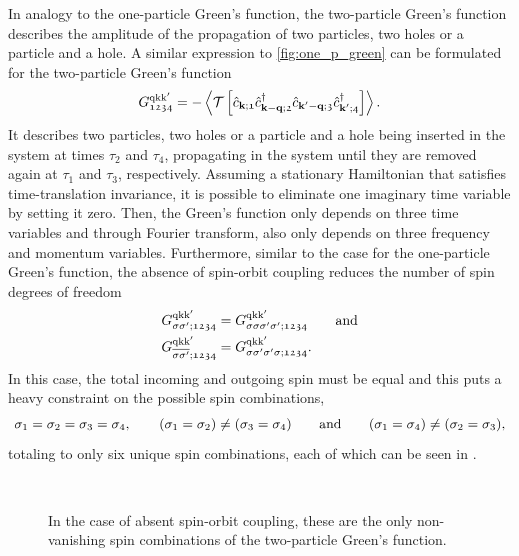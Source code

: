 \documentclass[../../main.tex]{subfiles}
\begin{document}
In analogy to the one-particle Green's function, the two-particle Green's function describes the amplitude of the propagation of two particles, two holes or a particle and a hole. A similar expression to \eqref{fig:one_p_green} can be formulated for the two-particle Green's function
\begin{align}
	G_{\mathfrak{1234}}^{\text{q}\text{k}\text{k}'}=-\left\langle \mathcal{T}\left [\hat{c}_{\textbf{k};\mathfrak{1}}\hat{c}^{\dagger}_{\textbf{k}-\textbf{q};\mathfrak{2}}\hat{c}_{\textbf{k}'-\textbf{q};\mathfrak{3}}\hat{c}^{\dagger}_{\textbf{k}';\mathfrak{4}}\right ]\right\rangle.
\end{align}
It describes two particles, two holes or a particle and a hole being inserted in the system at times $\tau_2$ and $\tau_4$, propagating in the system until they are removed again at $\tau_1$ and $\tau_3$, respectively. Assuming a stationary Hamiltonian that satisfies time-translation invariance, it is possible to eliminate one imaginary time variable by setting it zero. Then, the Green's function only depends on three time variables and through Fourier transform, also only depends on three frequency and momentum variables. 
Furthermore, similar to the case for the one-particle Green's function, the absence of spin-orbit coupling reduces the number of spin degrees of freedom 
\begin{subequations}
\begin{align}
	G_{\sigma\sigma';\mathfrak{1234}}^{\text{q}\text{k}\text{k}'}&=G_{\sigma\sigma\sigma'\sigma';\mathfrak{1234}}^{\text{q}\text{k}\text{k}'} \qquad\text{and}\\
	G_{\overline{\sigma\sigma'};\mathfrak{1234}}^{\text{q}\text{k}\text{k}'}&=G_{\sigma\sigma'\sigma'\sigma;\mathfrak{1234}}^{\text{q}\text{k}\text{k}'}.
\end{align}
\end{subequations}
In this case, the total incoming and outgoing spin must be equal and this puts a heavy constraint on the possible spin combinations,
\begin{align}
	\sigma_1=\sigma_2=\sigma_3=\sigma_4, \qquad (\sigma_1=\sigma_2) \neq (\sigma_3=\sigma_4)\qquad\text{and}\qquad (\sigma_1=\sigma_4)\neq(\sigma_2=\sigma_3),
\end{align}
totaling to only six unique spin combinations, each of which can be seen in .
\begin{figure}[h]
  \centering
  \vspace{0.5cm}\\
  \caption{In the case of absent spin-orbit coupling, these are the only non-vanishing spin combinations of the two-particle Green's function.}
  \label{fig:two_particle_green_spins}
\end{figure}
\end{document}
